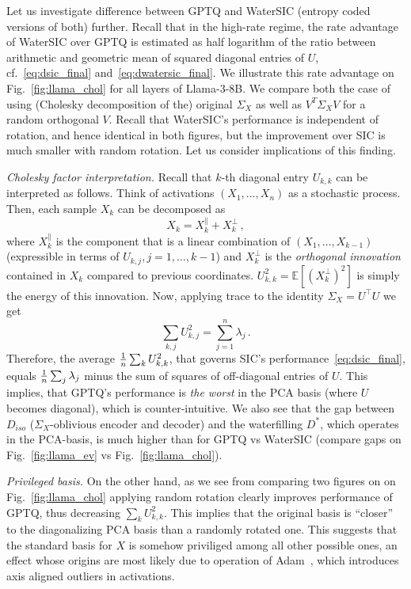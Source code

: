 \documentclass[journal]{IEEEtran}
\def\EE{\mathbb{E}}
\begin{document}
Let us investigate difference between GPTQ and WaterSIC (entropy coded versions of both) further.
Recall that in the high-rate regime, the rate advantage of WaterSIC over GPTQ is estimated as half logarithm
of the ratio between arithmetic and geometric mean of squared diagonal entries of $U$,
cf.~\eqref{eq:dsic_final} and~\eqref{eq:dwatersic_final}.  We illustrate this rate
advantage on Fig.~\ref{fig:llama_chol} for all layers of Llama-3-8B. We compare both the case of
using (Cholesky decomposition of the) original $\Sigma_X$ as well as $V^T \Sigma_X V$ for a random
orthogonal $V$. Recall that WaterSIC's performance is independent of rotation, and hence identical
in both figures, but the improvement over SIC is much smaller with random rotation. Let us
consider implications of this finding.

\textit{Cholesky factor interpretation.} Recall that $k$-th diagonal entry $U_{k,k}$ can be interpreted as follows. Think of
activations $(X_1,\ldots,X_n)$ as a stochastic process. Then, each sample $X_k$ can be
decomposed as 
$$ X_k = X_k^{\|} + X_k^{\perp}\,,$$
where $X_k^{\|}$ is the component that is a linear combination of $(X_1,\ldots,X_{k-1})$
(expressible in terms of $U_{k,j}, j = 1,\ldots,k-1$) and $X_k^{\perp}$ is the \emph{orthogonal
innovation} contained in $X_k$ compared to previous coordinates. $U_{k,k}^2 =
\EE[(X_k^{\perp})^2]$ is simply the energy of this innovation. Now, applying trace to the 
identity $\Sigma_X = U^\top U$ we get
$$ \sum_{k,j} U_{k,j}^2 = \sum_{j=1}^n \lambda_j\,. $$
Therefore, the average ${1\over n} \sum_k U_{k,k}^2$, that governs SIC's
performance~\eqref{eq:dsic_final}, equals ${1\over n} \sum_j \lambda_j$ minus the sum of squares of
off-diagonal entries of $U$. This implies, that GPTQ's performance is \textit{the worst} in the PCA
basis (where $U$ becomes diagonal), which is counter-intuitive. We also see that
the gap between $D_{iso}$ ($\Sigma_X$-oblivious encoder and decoder) and the waterfilling $D^*$,
which operates in the PCA-basis, is
much higher than for GPTQ vs WaterSIC (compare gaps on Fig.~\ref{fig:llama_ev} vs
Fig.~\ref{fig:llama_chol}).


\textit{Privileged basis.} On the other hand, as we see from
comparing two figures on on Fig.~\ref{fig:llama_chol} applying random rotation clearly improves
performance of GPTQ, thus decreasing $\sum_k U_{k,k}^2$. This implies that the original basis is
``closer'' to the diagonalizing PCA basis than a randomly rotated one.
This suggests that the standard basis for
$X$ is somehow priviliged among all other possible ones, an effect whose origins are most likely
due to operation of Adam~\cite{elhage2023mathematical}, which introduces axis aligned outliers in
activations. 
\end{document}

